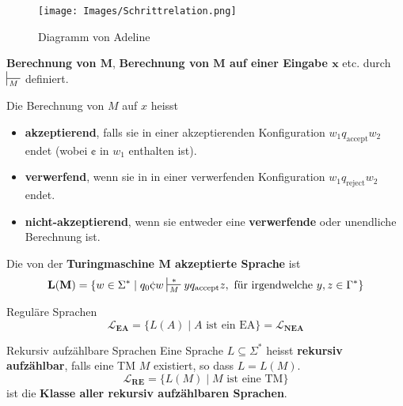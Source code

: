         \begin{figure}[htp]
            \texttt{[image: Images/Schrittrelation.png]}
            \caption{Diagramm von Adeline}
        \end{figure}


    
        \textbf{Berechnung von $\mathbf{M}$}, \textbf{Berechnung von $\mathbf{M}$ auf einer Eingabe $\mathbf{x}$} etc. durch $\sststile{M}{}$ definiert.
    
        \begin{mainbox}{}
            Die Berechnung von $M$ auf $x$ heisst 
            \begin{itemize}[label=-]
                \item \textbf{akzeptierend}, falls sie in einer akzeptierenden Konfiguration $w_1q_{\text{accept}}w_2$ endet (wobei $\cent$ in $w_1$ enthalten ist).
                \item \textbf{verwerfend}, wenn sie in in einer verwerfenden Konfiguration $w_1q_{\text{reject}}w_2$ endet.
                \item \textbf{nicht-akzeptierend}, wenn sie entweder eine \textbf{verwerfende} oder unendliche Berechnung ist.
            \end{itemize}
        \end{mainbox}
    
        \begin{mainbox}{}
            Die von der \textbf{Turingmaschine $\mathbf{M}$ akzeptierte Sprache} ist 
            $$\mathbf{L(M)} = \{w \in \Sigma^* \mid q_0\cent w \sststile{M}{*}yq_{\text{accept}}z, \text{ für irgendwelche }y, z \in \Gamma^*\}$$
        \end{mainbox}
    
    
    
        \begin{subbox}{Reguläre Sprachen}
            $$\mathbf{\mathcal{L}_{\textbf{EA}}} = \{L(A) \mid A \text{ ist ein EA}\} = {\mathcal{L}_{\textbf{NEA}}}$$
        \end{subbox}
    
        \begin{mainbox}{Rekursiv aufzählbare Sprachen}
            Eine Sprache $L \subseteq \Sigma^*$ heisst \textbf{rekursiv aufzählbar}, falls eine TM $M$ existiert, so dass $L = L(M)$.
            $$\mathbf{\mathcal{L}_{\textbf{RE}}} = \{L(M) \mid M \text{ ist eine TM}\}$$
            ist die \textbf{Klasse aller rekursiv aufzählbaren Sprachen}.
        \end{mainbox}
    
